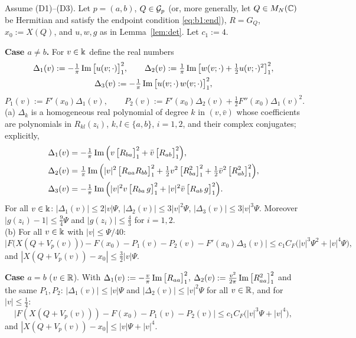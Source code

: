 \begin{lemma}\label{lem:expand}
Assume \textup{(D1)--(D3)}. Let $p=(a,b)$, $Q\in\mathcal{G}_p$ \textup{(or, more generally, let $Q\in M_N(\mathbb{C})$ be Hermitian and satisfy the endpoint condition \eqref{eq:b1:end})},
$R=G_Q$, $x_0:=X(Q)$, and $u,w,g$ as in Lemma~\ref{lem:det}. Let $c_1:=4$.

\smallskip\noindent\textup{\textbf{Case $a\ne b$.}} For $v\in\Bbbk$ define the real numbers
\begin{gather*}
\Delta_1(v):=-\tfrac1\pi\operatorname{Im}\big[u(v;\cdot)\big]_{1}^{2},\qquad\Delta_2(v):=\tfrac1\pi\operatorname{Im}\big[w(v;\cdot)+\tfrac12u(v;\cdot)^2\big]_{1}^{2},\\
\Delta_3(v):=-\tfrac1\pi\operatorname{Im}\big[u(v;\cdot)\,w(v;\cdot)\big]_{1}^{2},
\end{gather*}
\[
P_1(v):=F'(x_0)\Delta_1(v),\qquad P_2(v):=F'(x_0)\Delta_2(v)+\tfrac12F''(x_0)\Delta_1(v)^2 .
\]
\textup{(a)} $\Delta_k$ is a homogeneous real polynomial of degree $k$ in $(v,\bar v)$ whose coefficients are polynomials
in $R_{kl}(z_i)$, $k,l\in\{a,b\}$, $i=1,2$, and their complex conjugates; explicitly,
\begin{align}
\Delta_1(v)&=-\tfrac1\pi\operatorname{Im}\Big(v\,\big[R_{ba}\big]_{1}^{2}+\bar v\,\big[R_{ab}\big]_{1}^{2}\Big),\label{eq:b1:D1}\\
\Delta_2(v)&=\tfrac1\pi\operatorname{Im}\Big(|v|^2\,\big[R_{aa}R_{bb}\big]_{1}^{2}+\tfrac12v^2\,\big[R_{ba}^2\big]_{1}^{2}+\tfrac12\bar v^2\,\big[R_{ab}^2\big]_{1}^{2}\Big),\label{eq:b1:D2}\\
\Delta_3(v)&=-\tfrac1\pi\operatorname{Im}\Big(|v|^2v\,\big[R_{ba}\,g\big]_{1}^{2}+|v|^2\bar v\,\big[R_{ab}\,g\big]_{1}^{2}\Big).\label{eq:b1:D3}
\end{align}
For all $v\in\Bbbk$: $|\Delta_1(v)|\le2|v|\Psi$, $|\Delta_2(v)|\le3|v|^2\Psi$, $|\Delta_3(v)|\le3|v|^3\Psi$. Moreover $|g(z_i)-1|\le\frac94\Psi$ and $|g(z_i)|\le\frac43$ for $i=1,2$.\\
\textup{(b)} For all $v\in\Bbbk$ with $|v|\le\Psi/40$:
\[
\Big|F\big(X(Q+V_p(v))\big)-F(x_0)-P_1(v)-P_2(v)-F'(x_0)\Delta_3(v)\Big|\le c_1C_F\big(|v|^3\Psi^2+|v|^4\Psi\big),
\]
and $|X(Q+V_p(v))-x_0|\le\frac32|v|\Psi$.

\smallskip\noindent
\textup{\textbf{Case $a=b$}} ($v\in\mathbb{R}$). With $\Delta_1(v):=-\frac v\pi\operatorname{Im}\big[R_{aa}\big]_{1}^{2}$, $\Delta_2(v):=\frac{v^2}{2\pi}\operatorname{Im}\big[R_{aa}^2\big]_{1}^{2}$ and the same
$P_1,P_2$: $|\Delta_1(v)|\le|v|\Psi$ and $|\Delta_2(v)|\le|v|^2\Psi$ for all $v\in\mathbb{R}$, and for $|v|\le\frac14$:
\[
\big|F(X(Q+V_p(v)))-F(x_0)-P_1(v)-P_2(v)\big|\le c_1C_F\big(|v|^3\Psi+|v|^4\big),
\]
and $|X(Q+V_p(v))-x_0|\le|v|\Psi+|v|^4$.
\end{lemma}

